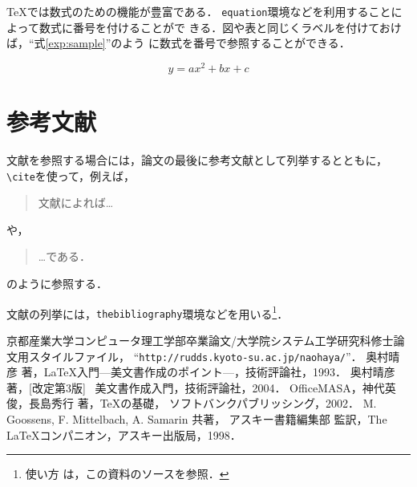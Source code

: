 \documentclass[11pt]{jreport}
\begin{document}
\TeX では数式のための機能が豊富である．
{\tt equation}環境などを利用することによって数式に番号を付けることがで
きる．図や表と同じくラベルを付けておけば，``式\ref{exp:sample}''のよう
に数式を番号で参照することができる．

\begin{equation}
  y = ax^2 + bx + c \label{exp:sample}
\end{equation}

\chapter{参考文献}

文献を参照する場合には，論文の最後に参考文献として列挙するとともに，
\verb|\cite|を使って，例えば，
\begin{quote}
  文献\cite{latex}によれば…
\end{quote}
や，
\begin{quote}
  …である\cite{latex2e}．
\end{quote}
のように参照する．

文献の列挙には，{\tt thebibliography}環境などを用いる\footnote{使い方
は，この資料のソースを参照．}．









\begin{thebibliography}{99}
    京都産業大学コンピュータ理工学部卒業論文/大学院システム工学研究科修士論文用スタイルファイル，
    ``{\tt http://rudds.kyoto-su.ac.jp/naohaya/}''．
    奥村晴彦 著，\LaTeX 入門---美文書作成のポイント---，技術評論社，1993．
    奥村晴彦 著，[改定第3版] \LaTeXe~美文書作成入門，技術評論社，2004．
    OfficeMASA，神代英俊，長島秀行 著，\TeX の基礎，
    ソフトバンクパブリッシング，2002．
    M. Goossens, F. Mittelbach, A. Samarin 共著，
    アスキー書籍編集部 監訳，The \LaTeX コンパニオン，アスキー出版局，1998．
\end{thebibliography}
\end{document}
